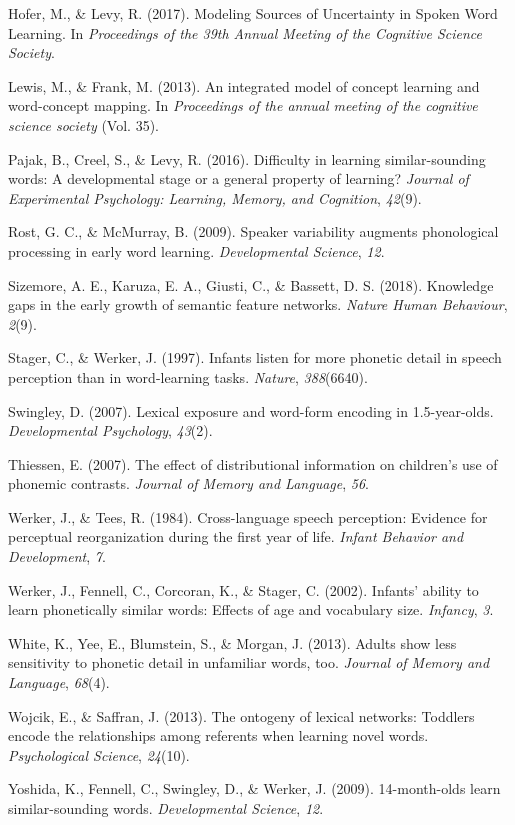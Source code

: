 \documentclass[10pt, letterpaper]{article}
\begin{document}
\hypertarget{ref-hofer2017}{}
Hofer, M., \& Levy, R. (2017). Modeling Sources of Uncertainty in Spoken
Word Learning. In \emph{Proceedings of the 39th Annual Meeting of the
Cognitive Science Society}.

\hypertarget{ref-lewis2013}{}
Lewis, M., \& Frank, M. (2013). An integrated model of concept learning
and word-concept mapping. In \emph{Proceedings of the annual meeting of
the cognitive science society} (Vol. 35).

\hypertarget{ref-pajak2016}{}
Pajak, B., Creel, S., \& Levy, R. (2016). Difficulty in learning
similar-sounding words: A developmental stage or a general property of
learning? \emph{Journal of Experimental Psychology: Learning, Memory,
and Cognition}, \emph{42}(9).

\hypertarget{ref-rost2009}{}
Rost, G. C., \& McMurray, B. (2009). Speaker variability augments
phonological processing in early word learning. \emph{Developmental
Science}, \emph{12}.

\hypertarget{ref-sizemore2018}{}
Sizemore, A. E., Karuza, E. A., Giusti, C., \& Bassett, D. S. (2018).
Knowledge gaps in the early growth of semantic feature networks.
\emph{Nature Human Behaviour}, \emph{2}(9).

\hypertarget{ref-stager1997}{}
Stager, C., \& Werker, J. (1997). Infants listen for more phonetic
detail in speech perception than in word-learning tasks. \emph{Nature},
\emph{388}(6640).

\hypertarget{ref-swingley2007}{}
Swingley, D. (2007). Lexical exposure and word-form encoding in
1.5-year-olds. \emph{Developmental Psychology}, \emph{43}(2).

\hypertarget{ref-thiessen2007}{}
Thiessen, E. (2007). The effect of distributional information on
children's use of phonemic contrasts. \emph{Journal of Memory and
Language}, \emph{56}.

\hypertarget{ref-werker1984}{}
Werker, J., \& Tees, R. (1984). Cross-language speech perception:
Evidence for perceptual reorganization during the first year of life.
\emph{Infant Behavior and Development}, \emph{7}.

\hypertarget{ref-werker2002}{}
Werker, J., Fennell, C., Corcoran, K., \& Stager, C. (2002). Infants'
ability to learn phonetically similar words: Effects of age and
vocabulary size. \emph{Infancy}, \emph{3}.

\hypertarget{ref-white2013}{}
White, K., Yee, E., Blumstein, S., \& Morgan, J. (2013). Adults show
less sensitivity to phonetic detail in unfamiliar words, too.
\emph{Journal of Memory and Language}, \emph{68}(4).

\hypertarget{ref-wojcik2013}{}
Wojcik, E., \& Saffran, J. (2013). The ontogeny of lexical networks:
Toddlers encode the relationships among referents when learning novel
words. \emph{Psychological Science}, \emph{24}(10).

\hypertarget{ref-yoshida2009}{}
Yoshida, K., Fennell, C., Swingley, D., \& Werker, J. (2009).
14-month-olds learn similar-sounding words. \emph{Developmental
Science}, \emph{12}.
\end{document}
